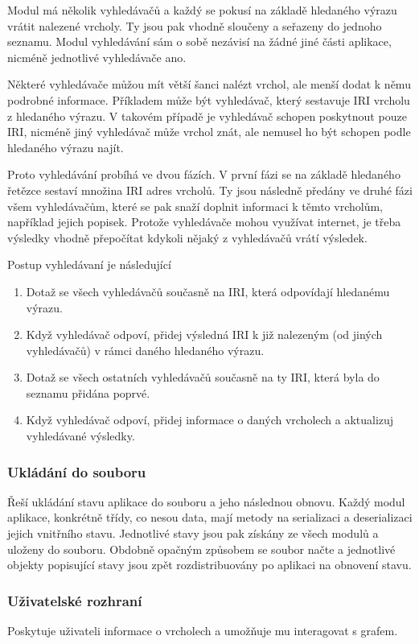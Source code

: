 Modul má několik vyhledávačů a každý se pokusí na základě hledaného výrazu vrátit nalezené vrcholy. Ty jsou pak vhodně sloučeny a seřazeny do jednoho seznamu. Modul vyhledávání sám o sobě nezávisí na žádné jiné části aplikace, nicméně jednotlivé vyhledávače ano.

Některé vyhledávače můžou mít větší šanci nalézt vrchol, ale menší dodat k němu podrobné informace. Příkladem může být vyhledávač, který sestavuje IRI vrcholu z hledaného výrazu. V takovém případě je vyhledávač schopen poskytnout pouze IRI, nicméně jiný vyhledávač může vrchol znát, ale nemusel ho být schopen podle hledaného výrazu najít.

Proto vyhledávání probíhá ve dvou fázích. V první fázi se na základě hledaného řetězce sestaví množina IRI adres vrcholů. Ty jsou následně předány ve druhé fázi všem vyhledávačům, které se pak snaží doplnit informaci k těmto vrcholům, například jejich popisek. Protože vyhledávače mohou využívat internet, je třeba výsledky vhodně přepočítat kdykoli nějaký z vyhledávačů vrátí výsledek.

Postup vyhledávaní je následující
\begin{enumerate}
    \item Dotaž se všech vyhledávačů současně na IRI, která odpovídají hledanému výrazu.
    \item Když vyhledávač odpoví, přidej výsledná IRI k již nalezeným (od jiných vyhledávačů) v rámci daného hledaného výrazu.
    \item Dotaž se všech ostatních vyhledávačů současně na ty IRI, která byla do seznamu přidána poprvé.
    \item Když vyhledávač odpoví, přidej informace o daných vrcholech a aktualizuj vyhledávané výsledky.
\end{enumerate}

\subsubsection{Ukládání do souboru}
Řeší ukládání stavu aplikace do souboru a jeho následnou obnovu. Každý modul aplikace, konkrétně třídy, co nesou data, mají metody na serializaci a deserializaci jejich vnitřního stavu. Jednotlivé stavy jsou pak získány ze všech modulů a uloženy do souboru. Obdobně opačným způsobem se soubor načte a jednotlivé objekty popisující stavy jsou zpět rozdistribuovány po aplikaci na obnovení stavu.

\subsubsection{Uživatelské rozhraní}
Poskytuje uživateli informace o vrcholech a umožňuje mu interagovat s grafem.